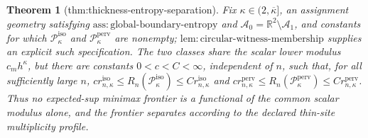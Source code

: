 \documentclass{article}
\newtheorem{theorem}{Theorem}
\begin{document}
\begin{theorem}[thm:thickness-entropy-separation]\label{thm:thickness-entropy-separation}
Fix \(\kappa\in(2,\overline\kappa]\), an assignment geometry satisfying \(\mathrm{ass:global\text{-}boundary\text{-}entropy}\) and \(\mathcal A_0=\mathbb R^2\setminus\mathcal A_1\), and constants for which \(\mathcal P_{\kappa}^{\mathrm{iso}}\) and \(\mathcal P_{\kappa}^{\mathrm{perv}}\) are nonempty; \(\mathrm{lem:circular\text{-}witness\text{-}membership}\) supplies an explicit such specification. The two classes share the scalar lower modulus \(c_mh^{\kappa}\), but there are constants \(0<c<C<\infty\), independent of \(n\), such that, for all sufficiently large \(n\), \(c r_{n,\kappa}^{\mathrm{iso}}\le R_n(\mathcal P_{\kappa}^{\mathrm{iso}})\le C r_{n,\kappa}^{\mathrm{iso}}\) and \(c r_{n,\kappa}^{\mathrm{perv}}\le R_n(\mathcal P_{\kappa}^{\mathrm{perv}})\le C r_{n,\kappa}^{\mathrm{perv}}\). Thus no expected-sup minimax frontier is a functional of the common scalar modulus alone, and the frontier separates according to the declared thin-site multiplicity profile.
\end{theorem}
\end{document}
